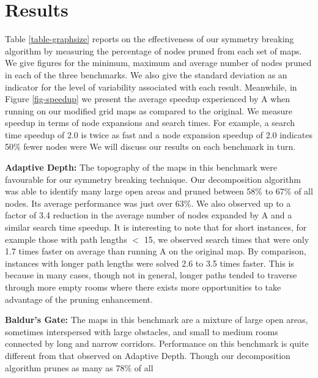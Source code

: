 \section{Results}
\label{sec-results}
Table \ref{table-graphsize} reports on the effectiveness of our
symmetry breaking algorithm by measuring the percentage of nodes
pruned from each set of maps.  We give figures for the minimum,
maximum and average number of nodes pruned in each of the three
benchmarks.  We also give the standard deviation as an indicator
for the level of variability associated with each result.  Meanwhile,
in Figure \ref{fig-speedup} we present the average speedup experienced
by A\* when running on our modified grid maps as compared to the
original.  We measure speedup in terms of node expansions and search
times.  For example, a search time speedup of 2.0 is twice as fast and
a node expansion speedup of 2.0 indicates 50\% fewer nodes were
We will discuss our results on each benchmark in turn.

\textbf{Adaptive Depth:} 
The topography of the maps in this benchmark were favourable for
our symmetry breaking technique.  Our decomposition algorithm was
able to identify many large open areas and pruned between 58\%
to 67\% of all nodes.  Its average performance was just over
63\%.  We also observed up to a factor of 3.4 reduction in the average 
number of nodes expanded by A\* and a similar search time speedup.
It is interesting to note that for short instances, for example
those with path lengths $<$ 15, we observed search times that were only 1.7
times faster on average than running A\* on the original map.  
By comparison, instances with
longer path lengths were solved 2.6 to 3.5 times faster.  
This is because in many cases, though not in general, longer paths 
tended to traverse through more empty rooms where there exists more 
opportunities to take advantage of the pruning enhancement.
%
\par
\textbf{Baldur's Gate: }
The maps in this benchmark are a mixture of large open areas,
sometimes interspersed with large obstacles, and small to medium
rooms connected by long and narrow corridors.  Performance on this
benchmark is quite different from that observed on Adaptive Depth.
Though our decomposition algorithm prunes as many as 78\% of all
